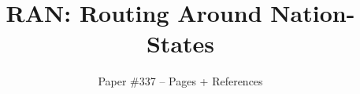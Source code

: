 \documentclass[sigconf]{acmart}
\newcommand{\system}{RAN}
\begin{document}
\date{}
\title{{
{\system{}: Routing Around Nation-States}}}
\author{
{Paper \#337 -- \pageref{lastpage} Pages + References} \\
}




\end{document}
